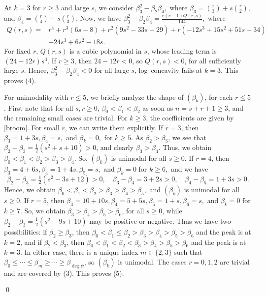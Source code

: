 \documentclass[12pt,twoside]{article}
\renewenvironment{proof}{{\noindent\bfseries Proof.}}{\qed}
\begin{document}
\begin{proof}
	At $k=3$ for $r\ge 3$ and large $s$, we consider $\beta_3^2 - \beta_2\beta_4,$ where $\beta_3=\binom{r}{3}+s\binom{r}{2}, $ and $
	\beta_4=\binom{r}{4}+s\binom{r}{3}.$ Now, we have $\beta_3^2 - \beta_2\beta_4
	= \frac{r(r-1)Q(r,s)}{144},$ where
	\begin{align*}
		Q(r,s)
		=& r^4 + r^3(6s-8) + r^2(9s^2 - 33s + 29) + r(-12s^3 + 15s^2 + 51s - 34)\\
		&+ 24s^3 + 6s^2 - 18s.
	\end{align*}
	For fixed $r$, $Q(r,s)$ is a cubic polynomial in $s$, whose leading term is $(24-12r)s^3.$ If $r\ge 3$, then $24-12r<0$, so $Q(r,s)<0$, for all sufficiently large $s$. Hence, $\beta_3^2 - \beta_2\beta_4<0$ for all large $s$, log–concavity fails at $k=3$. This proves (4).
	
	For unimodality with $r\le 5$, we briefly analyze the shape of $(\beta_k)$, for each $r\le 5$. First note that for all $s,r\ge 0$, $\beta_0<\beta_1<\beta_2$ as soon as $n=s+r+1\ge 3$, and the remaining small cases are trivial. For $k\ge 3$, the coefficients are given by \eqref{broom}. For small $r$, we can write them explicitly. If $r=3$, then $\beta_3=1+3s,\beta_4=s,$ and $\beta_k=0,$ for $k\ge 5.$  As $\beta_2>\beta_3$, we see that 	$\beta_2-\beta_3=\tfrac12(s^2+s+10)>0$, and clearly $\beta_3>\beta_4$. Thus, we obtain  $\beta_0<\beta_1<\beta_2>\beta_3>\beta_4.$ So, $(\beta_k)$ is unimodal for all $s\ge 0$. If $r=4$, then $\beta_3=4+6s,  \beta_4=1+4s, \beta_5=s, $ and $\beta_k=0$ for $k\ge 6,$  
	and we have
	\[
	\beta_2-\beta_3=\tfrac12(s^2-3s+12)>0,\quad
	\beta_3-\beta_4=3+2s>0,\quad
	\beta_4-\beta_5=1+3s>0.
	\]
	Hence, we obtain  $\beta_0<\beta_1<\beta_2>\beta_3>\beta_4>\beta_5,$ and $(\beta_k)$ is unimodal for all $s\ge 0$. If $r=5$, then $\beta_3=10+10s,  \beta_4=5+5s,  \beta_5=1+s,  \beta_6=s,$ and $\beta_k=0$ for $k\ge 7.$ So, we obtain $\beta_3>\beta_4>\beta_5>\beta_6$, for all $s\ge 0$, while $\beta_2-\beta_3=\tfrac12(s^2-9s+10)$ may be positive or negative. Thus we have two possibilities: if $\beta_2\ge \beta_3$, then $\beta_0<\beta_1\le \beta_2>\beta_3>\beta_4>\beta_5>\beta_6$ and the peak is at $k=2$, and   if $\beta_2<\beta_3$, then $\beta_0<\beta_1<\beta_2<\beta_3>\beta_4>\beta_5>\beta_6$ and the peak is at $k=3$. In either case, there is a unique index $m\in\{2,3\}$ such that $\beta_0\le\cdots\le \beta_m\ge\cdots\ge \beta_{\deg\psi}$, so $(\beta_k)$ is unimodal. The cases $r=0,1,2$ are trivial and are covered by (3). This proves (5).
	

\end{proof}
\end{document}
